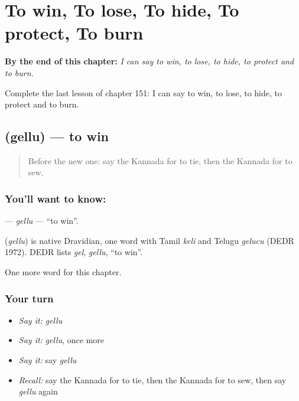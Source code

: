 
\chapter{To win, To lose, To hide, To protect, To burn}
\label{ch:ka-to-win-to-lose-to-hide-to-protect-to-burn}

\begin{chapteropening}
\textbf{By the end of this chapter:} \emph{I can say to win, to lose, to hide, to protect and to burn.}

Complete the last lesson of chapter 151: I can say to win, to lose, to hide, to protect and to burn.
\end{chapteropening}

\section[\texorpdfstring{\kn{ಗೆಲ್ಲು} (gellu)}{ಗೆಲ್ಲು (gellu)}]{ (gellu) — to win}

\label{lesson:KA-C151-gellu}



\begin{quote}
Before the new one: say the Kannada for to tie, then the Kannada for to sew.
\end{quote}

\subsection*{You'll want to know: }
\textbf{} — \emph{gellu} — \textquotedblleft{}to win\textquotedblright{}.

\begin{cousinweb}
\textbf{} (\emph{gellu}) is native Dravidian, one word with Tamil \emph{keli} and Telugu \emph{gelucu} (DEDR 1972). DEDR lists \emph{gel}, \emph{gellu}, \textquotedblleft{}to win\textquotedblright{}.
\end{cousinweb}

\begin{grammarlens}[title={What you've built}]
One more word for this chapter.
\end{grammarlens}

\subsection*{Your turn}
\begin{itemize}
\raggedright
  \item \emph{Say it:} \emph{gellu}
  \item \emph{Say it:} \emph{gellu}, once more
  \item \emph{Say it:} say \emph{gellu}
  \item \emph{Recall:} say the Kannada for to tie, then the Kannada for to sew, then say \emph{gellu} again
\end{itemize}

